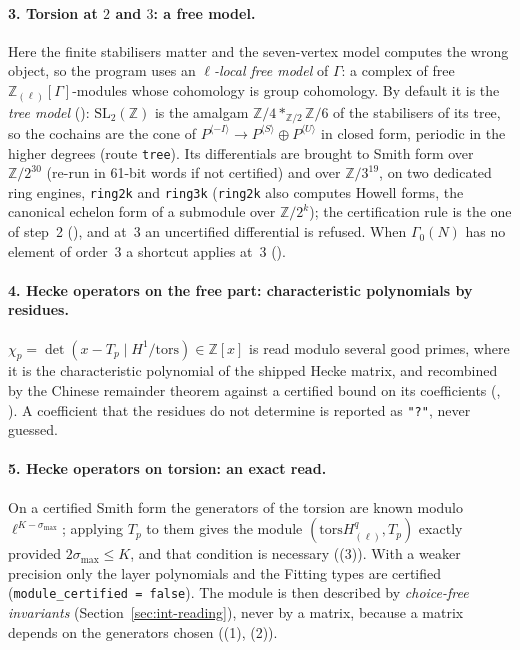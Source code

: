 \documentclass[11pt,openany]{report}
\newcommand{\Z}{\mathbb{Z}}
\newcommand{\SL}{\mathrm{SL}}
\newcommand{\tors}{\mathrm{tors}}
\begin{document}
\paragraph{3. Torsion at \texorpdfstring{$2$}{2} and \texorpdfstring{$3$}{3}: a free model.}
Here the finite stabilisers matter and the seven-vertex model computes the wrong object, so the program uses an
\emph{$\ell$-local free model} of $\Gamma$: a complex of free $\Z_{(\ell)}[\Gamma]$-modules whose cohomology is group
cohomology. By default it is the \emph{tree model} ({}): $\SL_2(\Z)$ is the amalgam
$\Z/4*_{\Z/2}\Z/6$ of the stabilisers of its tree, so the cochains are the cone of
$P^{\langle-I\rangle}\to P^{\langle S\rangle}\oplus P^{\langle U\rangle}$ in closed form, periodic in the higher degrees
(route \texttt{tree}). Its differentials are brought to Smith form over $\Z/2^{30}$ (re-run in 61-bit words if not certified)
and over $\Z/3^{19}$, on two dedicated ring engines, \texttt{ring2k} and \texttt{ring3k} (\texttt{ring2k} also computes Howell forms, the
canonical echelon form of a submodule over $\Z/2^k$);
the certification rule is the one of step~2 ({}), and at~3 an uncertified differential is
refused. When $\Gamma_0(N)$ has no element of order~3 a shortcut applies at~3 ({}).

\paragraph{4. Hecke operators on the free part: characteristic polynomials by residues.}
$\chi_p=\det(x-T_p\mid H^1/\tors)\in\Z[x]$ is read modulo several good primes, where it is the characteristic polynomial of
the shipped Hecke matrix, and recombined by the Chinese remainder theorem against a certified bound on its coefficients
({}, {}). A coefficient that the residues do not determine is
reported as \texttt{"?"}, never guessed.

\paragraph{5. Hecke operators on torsion: an exact read.}
On a certified Smith form the generators of the torsion are known modulo $\ell^{K-\sigma_{\max}}$; applying $T_p$ to them
gives the module $(\tors H^q_{(\ell)},T_p)$ exactly provided $2\sigma_{\max}\le K$, and that condition is necessary
({}(3)). With a weaker precision only the layer polynomials and the Fitting types are
certified (\texttt{module\_certified = false}). The module is then described by \emph{choice-free invariants}
(Section~\ref{sec:int-reading}), never by a matrix, because a matrix depends on the generators chosen
({}(1), (2)).
\end{document}
